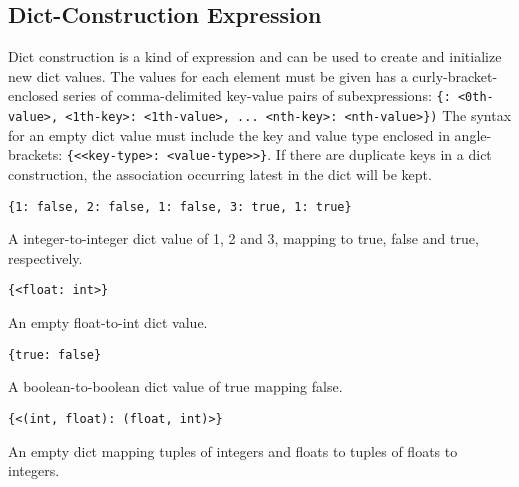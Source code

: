 
\subsection{Dict-Construction Expression}
{
	Dict construction is a kind of expression and can be
	used to create and initialize new dict values.
	The values for each element must be given has a curly-bracket-enclosed
	series of comma-delimited
	key-value pairs of
	subexpressions: \texttt{\{<0th-key>: <0th-value>, <1th-key>: <1th-value>, ... <nth-key>: <nth-value>\})}
	The syntax for an empty dict value must include the key and value
	type enclosed
	in angle-brackets: \texttt{\{<<key-type>: <value-type>>\}}.
	If there are duplicate keys in a dict construction, the
	association occurring latest in
	the dict will be kept.
	
	\begin{itemize}
	{
		\item[] \lstinline[language=MAIA, columns=fixed]@{1: false, 2: false, 1: false, 3: true, 1: true}@
		
			A integer-to-integer dict value of 1, 2 and 3, mapping to true,
			false and true, respectively.
		
		\item[] \lstinline[language=MAIA, columns=fixed]@{<float: int>}@
		
			An empty float-to-int dict value.
		
		\item[] \lstinline[language=MAIA, columns=fixed]@{true: false}@
		
			A boolean-to-boolean dict value of
			true mapping false.
		
		\item[] \lstinline[language=MAIA, columns=fixed]@{<(int, float): (float, int)>}@
		
			An empty dict mapping
			tuples of integers and floats to tuples of floats to integers.
	}
	\end{itemize}
}
